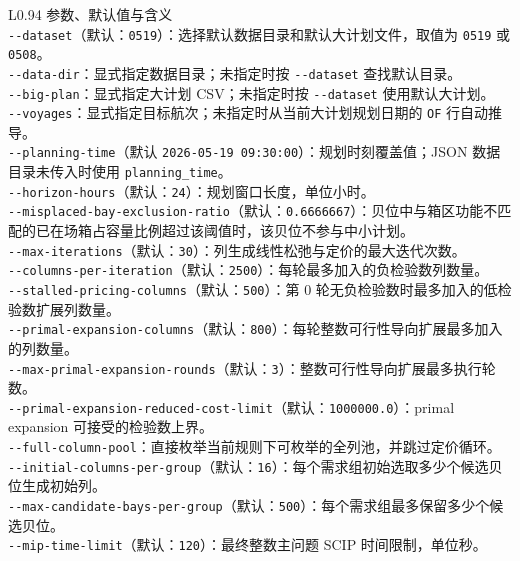 \documentclass[UTF8,a4paper,11pt]{ctexart}
\newcommand{\code}[1]{\nolinkurl{#1}}
\begin{document}
\begin{longtable}{L{0.94\linewidth}}
\toprule
参数、默认值与含义\\
\midrule
\code{--dataset}（默认：\code{0519}）：选择默认数据目录和默认大计划文件，取值为 \code{0519} 或 \code{0508}。\\[0.25em]
\code{--data-dir}：显式指定数据目录；未指定时按 \code{--dataset} 查找默认目录。\\[0.25em]
\code{--big-plan}：显式指定大计划 CSV；未指定时按 \code{--dataset} 使用默认大计划。\\[0.25em]
\code{--voyages}：显式指定目标航次；未指定时从当前大计划规划日期的 \code{OF} 行自动推导。\\[0.25em]
\code{--planning-time}（默认 \code{2026-05-19 09:30:00}）：规划时刻覆盖值；JSON 数据目录未传入时使用 \code{planning_time}。\\[0.25em]
\code{--horizon-hours}（默认：\code{24}）：规划窗口长度，单位小时。\\[0.25em]
\code{--misplaced-bay-exclusion-ratio}（默认：\code{0.6666667}）：贝位中与箱区功能不匹配的已在场箱占容量比例超过该阈值时，该贝位不参与中小计划。\\[0.25em]
\code{--max-iterations}（默认：\code{30}）：列生成线性松弛与定价的最大迭代次数。\\[0.25em]
\code{--columns-per-iteration}（默认：\code{2500}）：每轮最多加入的负检验数列数量。\\[0.25em]
\code{--stalled-pricing-columns}（默认：\code{500}）：第 0 轮无负检验数时最多加入的低检验数扩展列数量。\\[0.25em]
\code{--primal-expansion-columns}（默认：\code{800}）：每轮整数可行性导向扩展最多加入的列数量。\\[0.25em]
\code{--max-primal-expansion-rounds}（默认：\code{3}）：整数可行性导向扩展最多执行轮数。\\[0.25em]
\code{--primal-expansion-reduced-cost-limit}（默认：\code{1000000.0}）：primal expansion 可接受的检验数上界。\\[0.25em]
\code{--full-column-pool}：直接枚举当前规则下可枚举的全列池，并跳过定价循环。\\[0.25em]
\code{--initial-columns-per-group}（默认：\code{16}）：每个需求组初始选取多少个候选贝位生成初始列。\\[0.25em]
\code{--max-candidate-bays-per-group}（默认：\code{500}）：每个需求组最多保留多少个候选贝位。\\[0.25em]
\code{--mip-time-limit}（默认：\code{120}）：最终整数主问题 SCIP 时间限制，单位秒。\\[0.25em]

\end{longtable}
\end{document}
